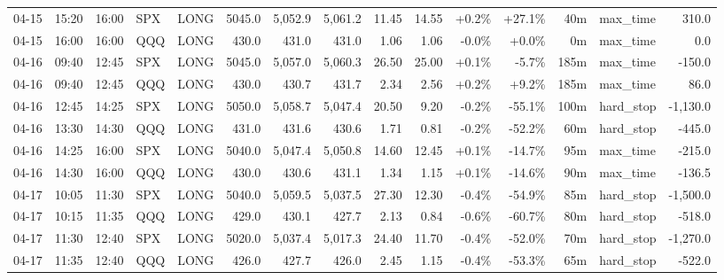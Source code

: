 \documentclass[11pt,a4paper,twoside]{article}
\begin{document}
\begin{landscape}
\begin{center}
\begin{longtable}{>{\color{txtmain}}l l l l l r r r r r r r r >{\color{txtmain}}l r}
04-15 & 15:20 & 16:00 & SPX & LONG & 5045.0 & 5,052.9 & 5,061.2 & 11.45 & 14.55 & \textcolor{wingreen}{+0.2\%} & \textcolor{wingreen}{+27.1\%} & 40m & max\_time & \textcolor{wingreen}{310.0} \\
04-15 & 16:00 & 16:00 & QQQ & LONG & 430.0 & 431.0 & 431.0 & 1.06 & 1.06 & \textcolor{lossred}{-0.0\%} & \textcolor{wingreen}{+0.0\%} & 0m & max\_time & \textcolor{wingreen}{0.0} \\
04-16 & 09:40 & 12:45 & SPX & LONG & 5045.0 & 5,057.0 & 5,060.3 & 26.50 & 25.00 & \textcolor{wingreen}{+0.1\%} & \textcolor{lossred}{-5.7\%} & 185m & max\_time & \textcolor{lossred}{-150.0} \\
04-16 & 09:40 & 12:45 & QQQ & LONG & 430.0 & 430.7 & 431.7 & 2.34 & 2.56 & \textcolor{wingreen}{+0.2\%} & \textcolor{wingreen}{+9.2\%} & 185m & max\_time & \textcolor{wingreen}{86.0} \\
04-16 & 12:45 & 14:25 & SPX & LONG & 5050.0 & 5,058.7 & 5,047.4 & 20.50 & 9.20 & \textcolor{lossred}{-0.2\%} & \textcolor{lossred}{-55.1\%} & 100m & hard\_stop & \textcolor{lossred}{-1,130.0} \\
04-16 & 13:30 & 14:30 & QQQ & LONG & 431.0 & 431.6 & 430.6 & 1.71 & 0.81 & \textcolor{lossred}{-0.2\%} & \textcolor{lossred}{-52.2\%} & 60m & hard\_stop & \textcolor{lossred}{-445.0} \\
04-16 & 14:25 & 16:00 & SPX & LONG & 5040.0 & 5,047.4 & 5,050.8 & 14.60 & 12.45 & \textcolor{wingreen}{+0.1\%} & \textcolor{lossred}{-14.7\%} & 95m & max\_time & \textcolor{lossred}{-215.0} \\
04-16 & 14:30 & 16:00 & QQQ & LONG & 430.0 & 430.6 & 431.1 & 1.34 & 1.15 & \textcolor{wingreen}{+0.1\%} & \textcolor{lossred}{-14.6\%} & 90m & max\_time & \textcolor{lossred}{-136.5} \\
04-17 & 10:05 & 11:30 & SPX & LONG & 5040.0 & 5,059.5 & 5,037.5 & 27.30 & 12.30 & \textcolor{lossred}{-0.4\%} & \textcolor{lossred}{-54.9\%} & 85m & hard\_stop & \textcolor{lossred}{-1,500.0} \\
04-17 & 10:15 & 11:35 & QQQ & LONG & 429.0 & 430.1 & 427.7 & 2.13 & 0.84 & \textcolor{lossred}{-0.6\%} & \textcolor{lossred}{-60.7\%} & 80m & hard\_stop & \textcolor{lossred}{-518.0} \\
04-17 & 11:30 & 12:40 & SPX & LONG & 5020.0 & 5,037.4 & 5,017.3 & 24.40 & 11.70 & \textcolor{lossred}{-0.4\%} & \textcolor{lossred}{-52.0\%} & 70m & hard\_stop & \textcolor{lossred}{-1,270.0} \\
04-17 & 11:35 & 12:40 & QQQ & LONG & 426.0 & 427.7 & 426.0 & 2.45 & 1.15 & \textcolor{lossred}{-0.4\%} & \textcolor{lossred}{-53.3\%} & 65m & hard\_stop & \textcolor{lossred}{-522.0} \\

\end{longtable}
\end{center}
\end{landscape}
\end{document}
